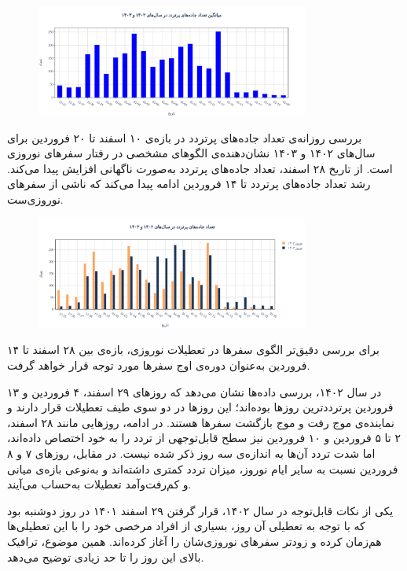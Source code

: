 \documentclass[a4paper, 12pt]{article}
\begin{document}
\begin{figure}[htbp]
    \centering
    \includegraphics[width=0.8\textwidth]{pics/peaks/count_mean.png}
\end{figure}

بررسی روزانه‌ی تعداد جاده‌های پرتردد در بازه‌ی ۱۰ اسفند تا ۲۰ فروردین برای سال‌های ۱۴۰۲ و ۱۴۰۳ نشان‌دهنده‌ی الگوهای مشخصی در رفتار سفرهای نوروزی است. از تاریخ ۲۸ اسفند، تعداد جاده‌های پرتردد به‌صورت ناگهانی افزایش پیدا می‌کند. رشد تعداد جاده‌های پرتردد تا ۱۴ فروردین ادامه پیدا می‌کند که ناشی از سفرهای نوروزی‌ست.

\begin{figure}[htbp]
    \centering
    \includegraphics[width=0.8\textwidth]{pics/peaks/count_both.png}
\end{figure}

برای بررسی دقیق‌تر الگوی سفرها در تعطیلات نوروزی، بازه‌ی بین ۲۸ اسفند تا ۱۴ فروردین به‌عنوان دوره‌ی اوج سفرها مورد توجه قرار خواهد گرفت.

\medskip
 در سال ۱۴۰۲، بررسی داده‌ها نشان می‌دهد که روزهای ۲۹ اسفند، ۴ فروردین و ۱۳ فروردین پرترددترین روزها بوده‌اند؛ این روزها در دو سوی طیف تعطیلات قرار دارند و نماینده‌ی موج رفت و موج بازگشت سفرها هستند. در ادامه، روزهایی مانند ۲۸ اسفند، ۲ تا ۵ فروردین و ۱۰ فروردین نیز سطح قابل‌توجهی از تردد را به خود اختصاص داده‌اند، اما شدت تردد آن‌ها به اندازه‌ی سه روز ذکر شده نیست. در مقابل، روزهای ۷ و ۸ فروردین نسبت به سایر ایام نوروز، میزان تردد کمتری داشته‌اند و به‌نوعی بازه‌ی میانی و کم‌رفت‌وآمد تعطیلات به‌حساب می‌آیند.

\medskip    
یکی از نکات قابل‌توجه در سال ۱۴۰۲، قرار گرفتن ۲۹ اسفند ۱۴۰۱ در روز دوشنبه بود که با توجه به تعطیلی آن روز، بسیاری از افراد مرخصی خود را با این تعطیلی‌ها هم‌زمان کرده و زودتر سفرهای نوروزی‌شان را آغاز کرده‌اند. همین موضوع، ترافیک بالای این روز را تا حد زیادی توضیح می‌دهد.
\end{document}
